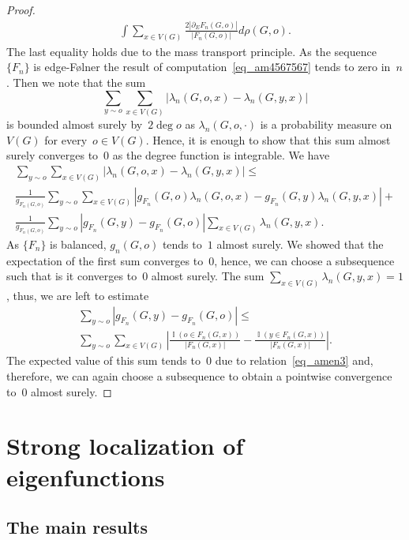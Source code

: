 \documentclass[english]{article}
\theoremstyle{definition}
\DeclareMathOperator{\I}{{\mathbb{I}}}
\begin{document}
\begin{proof}
\begin{multline}
        \int \sum_{x \in V(G)} \frac{2|\partial_E F_n(G,o)|}{|F_n(G,o)|} d \rho(G,o).
    \end{multline}
    The last equality holds due to the mass transport principle. As the sequence~$\{F_n\}$ is edge-F\o lner the result of computation~\eqref{eq_am4567567} tends to zero in~$n$. 
    Then we note that the sum 
    $$
    \sum_{y \sim o} \sum_{x \in V(G)} |\lambda_n(G,o,x) - \lambda_n(G,y,x)|
    $$
    is bounded almost surely by~$2\deg o$ as $\lambda_n(G,o, \cdot)$ is a probability measure on~$V(G)$ for every~$o \in V(G)$. Hence, it is enough to show that this sum almost surely converges to~$0$ as the degree function is integrable. We have 
    \begin{multline}
        \sum_{y \sim o} \sum_{x \in V(G)} |\lambda_n(G,o,x) - \lambda_n(G,y,x)| \le \\
        \frac{1}{g_{F_n(G,o)}}\sum_{y \sim o} \sum_{x \in V(G)} |g_{F_n}(G,o)\lambda_n(G,o,x) - g_{F_n} (G,y)\lambda_n(G,y,x)| + \\
        \frac{1}{g_{F_n(G,o)}} \sum_{y \sim o} \left|{g_{F_n}(G,y)}- {g_{F_n}(G,o)}\right| \sum_{x \in V(G)} \lambda_n(G,y,x).
    \end{multline}
    As $\{F_n\}$ is balanced, $g_n(G,o)$ tends to~$1$ almost surely. We showed that the expectation of the first sum converges to~$0$, hence, we can choose a subsequence such that is it converges to~$0$ almost surely. The sum $\sum_{x  \in V(G)} \lambda_n(G, y, x) = 1$, thus, we are left to estimate 
    \begin{multline}
        \sum_{y \sim o} \left|{g_{F_n}(G,y)}- {g_{F_n}(G,o)}\right| \le \\
        \sum_{y\sim o}\sum_{x \in V(G)} \left| \frac{\I(o \in F_n(G,x))}{ |F_n(G,x)|} - \frac{\I(y \in F_n(G,x))}{ |F_n(G,x)|} \right|.
    \end{multline}
    The expected value of this sum tends to~$0$ due to relation~\eqref{eq_amen3} and, therefore, we can again choose a subsequence to obtain a pointwise convergence to~$0$ almost surely.
\end{proof}



\section{Strong localization of eigenfunctions}

\subsection{The main results}
\end{document}
